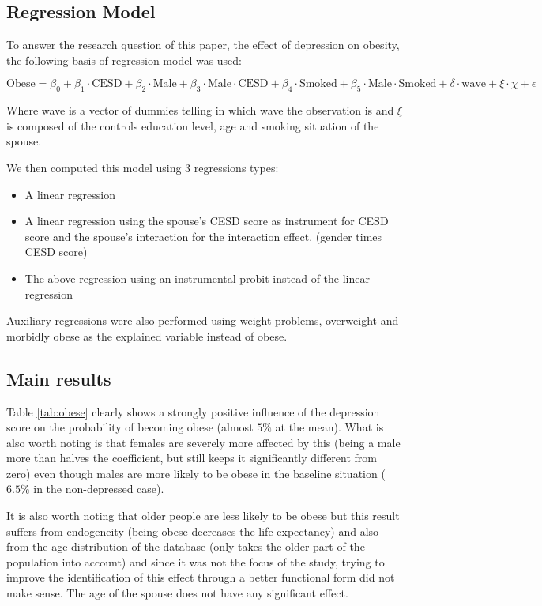 \subsection{Regression Model}
To answer the research question of this paper, the effect of depression on obesity, the following basis of regression model was used:


\[
\text{Obese} = \beta_0 + \beta_1 \cdot \text{CESD} + \beta_2  \cdot \text{Male} + \beta_3 \cdot \text{Male} \cdot  \text{CESD}+ \beta_4 \cdot \text{Smoked} + \beta_5 \cdot \text{Male} \cdot \text{Smoked} +\delta \cdot \text{wave}  + \xi \cdot \chi + \epsilon
\label{eq:model1}
\]

Where wave is a vector of dummies telling in which wave the observation is and $\xi$ is composed of the controls education level, age and smoking situation of the spouse.

We then computed this model using 3 regressions types: 
\begin{itemize}
\item A linear regression
\item A linear regression using the spouse's CESD score as instrument for CESD  score and the spouse's interaction for the interaction effect. (gender times CESD score)
\item The above regression using an instrumental probit instead of the linear regression
\end{itemize} 

Auxiliary regressions were also performed using weight problems, overweight and morbidly obese as the explained variable instead of obese.

\subsection{Main results}

Table \ref{tab:obese} clearly shows a strongly positive influence of the depression score on the probability of becoming obese (almost $5\%$ at the mean). What is also worth noting is that females are severely more affected by this (being a male more than halves the coefficient, but still keeps it significantly different from zero) even though males are more likely to be obese in the baseline situation ($6.5\%$ in the non-depressed case).

It is also worth noting that older people are less likely to be obese but this result suffers from endogeneity (being obese decreases the life expectancy) and also from the age distribution of the database (only takes the older part of the population into account) and since it was not the focus of the study, trying to improve the identification of this effect through a better functional form did not make sense. The age of the spouse does not have any significant effect.

